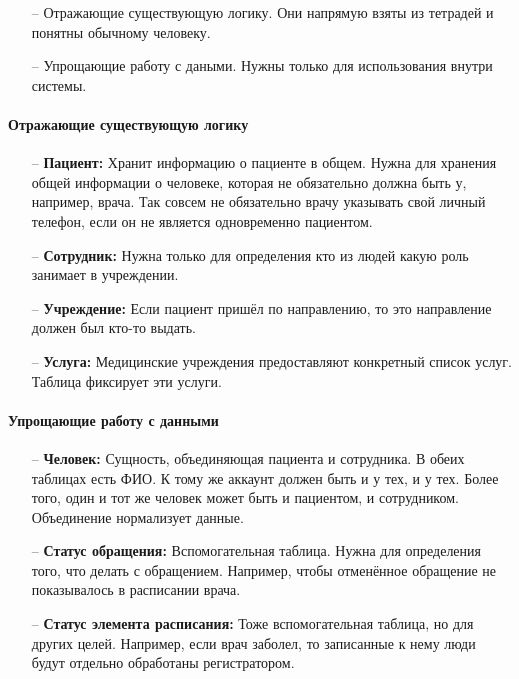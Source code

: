 \documentclass[a4paper,article]{article}
\begin{document}
    \begin{itemize}[nolistsep]
        \item[--] Отражающие существующую логику. Они напрямую взяты из тетрадей и понятны обычному человеку.
        \item[--] Упрощающие работу с даными. Нужны только для использования внутри системы.
    \end{itemize}

    \paragraph{Отражающие существующую логику}\label{Проектирование БД. Вспомогательные компоненты. Отражающие логику}

    \begin{itemize}[nolistsep]
        \item[--] \textbf{Пациент:} Хранит информацию о пациенте в общем. Нужна для хранения общей информации о человеке, которая не обязательно должна быть у, например, врача. Так совсем не обязательно врачу указывать свой личный телефон, если он не является одновременно пациентом.
        \item[--] \textbf{Сотрудник:} Нужна только для определения кто из людей какую роль занимает в учреждении.
        \item[--] \textbf{Учреждение:} Если пациент пришёл по направлению, то это направление должен был кто-то выдать.
        \item[--] \textbf{Услуга:} Медицинские учреждения предоставляют конкретный список услуг. Таблица фиксирует эти услуги.
    \end{itemize}

    \paragraph{Упрощающие работу с данными}\label{Проектирование БД. Вспомогательные компоненты. Упрощающие работу с данными}

    \begin{itemize}[nolistsep]
        \item[--] \textbf{Человек:} Сущность, объединяющая пациента и сотрудника. В обеих таблицах есть ФИО. К тому же аккаунт должен быть и у тех, и у тех. Более того, один и тот же человек может быть и пациентом, и сотрудником. Объединение нормализует данные.
        \item[--] \textbf{Статус обращения:} Вспомогательная таблица. Нужна для определения того, что делать с обращением. Например, чтобы отменённое обращение не показывалось в расписании врача.
        \item[--] \textbf{Статус элемента расписания:} Тоже вспомогательная таблица, но для других целей. Например, если врач заболел, то записанные к нему люди будут отдельно обработаны регистратором.
    \end{itemize}
\end{document}
